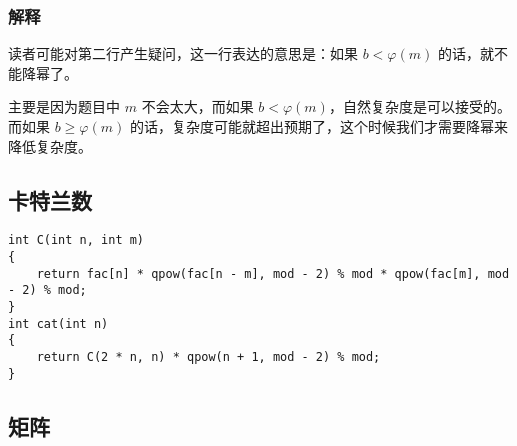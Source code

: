 \documentclass[]{article}
\begin{document}
\hypertarget{ux89e3ux91ca}{%
\subsubsection{解释}\label{ux89e3ux91ca}}

读者可能对第二行产生疑问，这一行表达的意思是：如果 \(b < \varphi(m)\)
的话，就不能降幂了。

主要是因为题目中 \(m\) 不会太大，而如果
\(b < \varphi(m)\)，自然复杂度是可以接受的。而如果 \(b \ge \varphi(m)\)
的话，复杂度可能就超出预期了，这个时候我们才需要降幂来降低复杂度。

\hypertarget{ux5361ux7279ux5170ux6570}{%
\subsection{卡特兰数}\label{ux5361ux7279ux5170ux6570}}

\begin{verbatim}
int C(int n, int m)
{
    return fac[n] * qpow(fac[n - m], mod - 2) % mod * qpow(fac[m], mod - 2) % mod;
}
int cat(int n)
{
    return C(2 * n, n) * qpow(n + 1, mod - 2) % mod;
}
\end{verbatim}

\hypertarget{ux77e9ux9635}{%
\subsection{矩阵}\label{ux77e9ux9635}}
\end{document}
